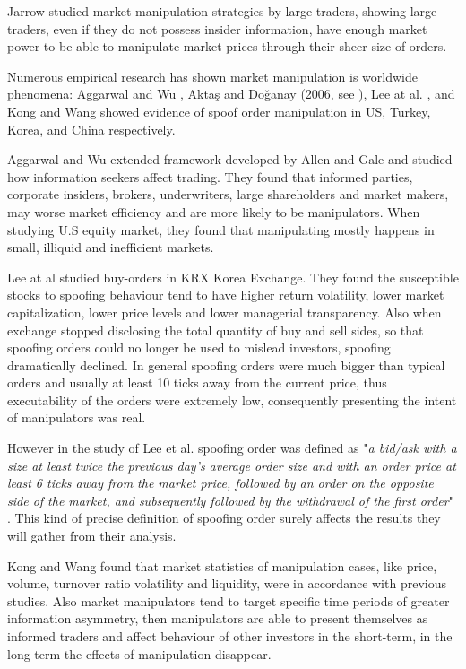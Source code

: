 \documentclass{tut-thesis}
\begin{document}
Jarrow \parencite*{Jarrow1992} studied market manipulation strategies by large traders, showing large traders, even if they do not possess insider information, have enough market power to be able to manipulate market prices through their sheer size of orders. 

Numerous empirical research has shown market manipulation is worldwide phenomena: Aggarwal and Wu \parencite*{AggarwalWu2006}, Aktaş and Doğanay (2006, see \cite{OgutDoganayAktas2009}), Lee at al. \parencite*{LeeEomPark2009}, and Kong and Wang \parencite*{KongWang2014} showed evidence of spoof order manipulation in US, Turkey, Korea, and China respectively.

Aggarwal and Wu \parencite*{AggarwalWu2006} extended framework developed by Allen and Gale and studied how information seekers affect trading. They found that informed parties, corporate insiders, brokers, underwriters, large shareholders and market makers, may worse market efficiency and are more likely to be manipulators. When studying U.S equity market, they found that manipulating mostly happens in small, illiquid and inefficient markets.

Lee at al \parencite*{LeeEomPark2009} studied buy-orders in KRX Korea Exchange. They found the susceptible stocks to spoofing behaviour tend to have higher return volatility, lower market capitalization, lower price levels and lower managerial transparency. Also when exchange stopped disclosing the total quantity of buy and sell sides, so that spoofing orders could no longer be used to mislead investors, spoofing dramatically declined. In general spoofing orders were much bigger than typical orders and usually at least 10 ticks away from the current price, thus executability of the orders were extremely low, consequently presenting the intent of manipulators was real. \autocite{LeeEomPark2009}

However in the study of Lee et al. spoofing order was defined as "\textit{a bid/ask with a size at least twice the previous day’s average order size and with an order price at least 6 ticks away from the market price, followed by an order on the opposite side of the market, and subsequently followed by the withdrawal of the first order}" \autocite[p. 11]{LeeEomPark2009}. This kind of precise definition of spoofing order surely affects the results they will gather from their analysis.

Kong and Wang \parencite*{KongWang2014} found that market statistics of manipulation cases, like price, volume, turnover ratio volatility and liquidity, were in accordance with previous studies. Also market manipulators tend to target specific time periods of greater information asymmetry, then manipulators are able to present themselves as informed traders and affect behaviour of other investors in the short-term, in the long-term the effects of manipulation disappear. \autocite{KongWang2014}
\end{document}
